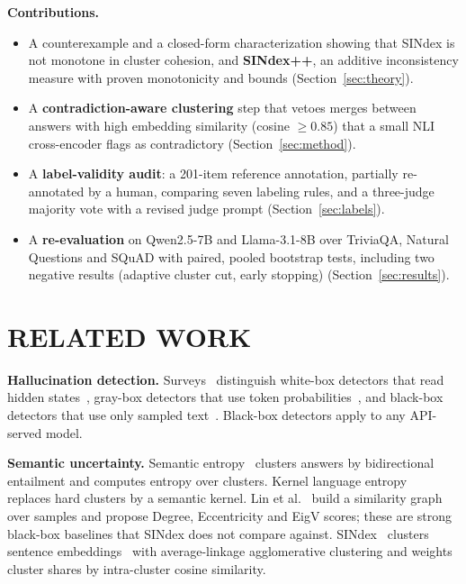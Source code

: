 \documentclass{ieeetj}
\begin{document}
\textbf{Contributions.}
\begin{itemize}
\item[\textbf{C1}] A counterexample and a closed-form characterization showing that SINdex is not monotone in cluster cohesion, and \textbf{SINdex++}, an additive inconsistency measure with proven monotonicity and bounds (Section~\ref{sec:theory}).
\item[\textbf{C2}] A \textbf{contradiction-aware clustering} step that vetoes merges between answers with high embedding similarity (cosine $\ge 0.85$) that a small NLI cross-encoder flags as contradictory (Section~\ref{sec:method}).
\item[\textbf{C3}] A \textbf{label-validity audit}: a 201-item reference annotation, partially re-annotated by a human, comparing seven labeling rules, and a three-judge majority vote with a revised judge prompt (Section~\ref{sec:labels}).
\item[\textbf{C4}] A \textbf{re-evaluation} on Qwen2.5-7B and Llama-3.1-8B over TriviaQA, Natural Questions and SQuAD with paired, pooled bootstrap tests, including two negative results (adaptive cluster cut, early stopping) (Section~\ref{sec:results}).
\end{itemize}

\section{RELATED WORK}
\textbf{Hallucination detection.} Surveys~\cite{ji2023survey,huang2025survey} distinguish white-box detectors that read hidden states~\cite{chen2024inside}, gray-box detectors that use token probabilities~\cite{kadavath2022language}, and black-box detectors that use only sampled text~\cite{manakul2023selfcheckgpt,lin2024generating}. Black-box detectors apply to any API-served model.

\textbf{Semantic uncertainty.} Semantic entropy~\cite{kuhn2023semantic,farquhar2024detecting} clusters answers by bidirectional entailment and computes entropy over clusters. Kernel language entropy~\cite{nikitin2024kernel} replaces hard clusters by a semantic kernel. Lin et al.~\cite{lin2024generating} build a similarity graph over samples and propose Degree, Eccentricity and EigV scores; these are strong black-box baselines that SINdex does not compare against. SINdex~\cite{abdaljalil2026sindex} clusters sentence embeddings~\cite{reimers2019sbert} with average-linkage agglomerative clustering and weights cluster shares by intra-cluster cosine similarity.
\end{document}
